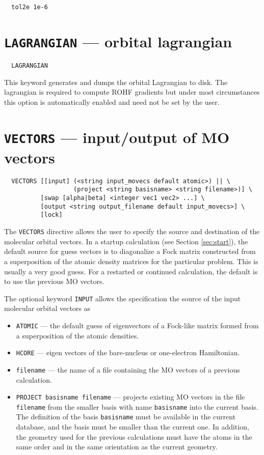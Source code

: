 \begin{verbatim}
  tol2e 1e-6
\end{verbatim}

\section{{\tt LAGRANGIAN} --- orbital lagrangian}

\begin{verbatim}
  LAGRANGIAN
\end{verbatim}

This keyword generates and dumps the orbital Lagrangian to disk. The
lagrangian is required to compute ROHF gradients but under most
circumstances this option is automatically enabled and need not be set
by the user.

\section{{\tt VECTORS} --- input/output of MO vectors}
\label{sec:vectors}


\begin{verbatim}
  VECTORS [[input] (<string input_movecs default atomic>) || \
                   (project <string basisname> <string filename>)] \
          [swap [alpha|beta] <integer vec1 vec2> ...] \
          [output <string output_filename default input_movecs>] \
          [lock]
\end{verbatim}

The \verb+VECTORS+ directive allows the user to specify the source and
destination of the molecular orbital vectors.  In a startup
calculation (see Section \ref{sec:start}), the default source for
guess vectors is to diagonalize a Fock matrix constructed from a
superposition of the atomic density matrices for the particular
problem.  This is usually a very good guess.  For a restarted or
continued calculation, the default is to use the previous MO vectors.

The optional keyword \verb+INPUT+ allows the specification the source
of the input molecular orbital vectors as
\begin{itemize}
\item \verb+ATOMIC+ --- the default guess of eigenvectors of a Fock-like
  matrix formed from a superposition of the atomic densities.
\item \verb+HCORE+ --- eigen vectors of the bare-nucleus or
  one-electron Hamiltonian.
\item \verb+filename+ --- the name of a file containing the MO
  vectors of a previous calculation.
\item \verb+PROJECT basisname filename+ --- projects existing MO
  vectors in the file \verb+filename+ from the smaller basis with name
  \verb+basisname+ into the current basis.  The definition of the
  basis \verb+basisname+ must be available in the current database,
  and the basis must be smaller than the current one.  In addition,
  the geometry used for the previous calculations must have the atoms
  in the same order and in the same orientation as the current
  geometry.
\end{itemize}
 
